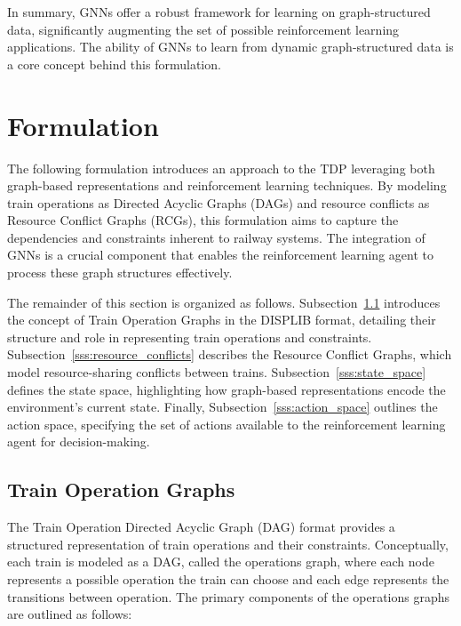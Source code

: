 \documentclass[runningheads]{llncs}
\begin{document}
In summary, GNNs offer a robust framework for learning on graph-structured data, significantly augmenting the set of possible reinforcement learning applications.
The ability of GNNs to learn from dynamic graph-structured data is a core concept behind this formulation.

\section{Formulation}
\label{sse:formulation}
The following formulation introduces an approach to the TDP leveraging both graph-based representations and reinforcement learning techniques. 
By modeling train operations as Directed Acyclic Graphs (DAGs) and resource conflicts as Resource Conflict Graphs (RCGs), this formulation aims to capture the dependencies and constraints inherent to railway systems. 
The integration of GNNs is a crucial component that enables the reinforcement learning agent to process these graph structures effectively.

The remainder of this section is organized as follows. 
Subsection~\ref{sss:train_ops} introduces the concept of Train Operation Graphs in the DISPLIB format, detailing their structure and role in representing train operations and constraints. 
Subsection~\ref{sss:resource_conflicts} describes the Resource Conflict Graphs, which model resource-sharing conflicts between trains. Subsection~\ref{sss:state_space} defines the state space, highlighting how graph-based representations encode the environment's current state. 
Finally, Subsection~\ref{sss:action_space} outlines the action space, specifying the set of actions available to the reinforcement learning agent for decision-making.

\subsection{Train Operation Graphs}
\label{sss:train_ops}

The Train Operation Directed Acyclic Graph (DAG) format provides a structured representation of train operations and their constraints. 
Conceptually, each train is modeled as a DAG, called the operations graph, where each node represents a possible operation the train can choose and each edge represents the transitions between operation.
The primary components of the operations graphs are outlined as follows:
\end{document}
